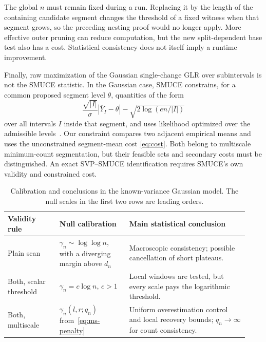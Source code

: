 \documentclass[pdflatex,sn-mathphys-num]{sn-jnl}
\theoremstyle{thmstyleone}
\theoremstyle{thmstyletwo}
\begin{document}
The global $n$ must remain fixed during a run. Replacing it by the length
of the containing candidate segment changes the threshold of a fixed
witness when that segment grows, so the preceding nesting proof would
no longer apply. More effective outer pruning can reduce computation, but
the new split-dependent base test also has a cost. Statistical consistency
does not itself imply a runtime improvement.

Finally, raw maximization of the Gaussian single-change GLR over
subintervals is not the SMUCE statistic. In the Gaussian case, SMUCE
constrains, for a common proposed segment level $\theta$, quantities of the
form
\begin{equation}\label{eq:smuce-distinction}
\frac{\sqrt{|I|}}{\sigma}|\overline Y_I-\theta|
-\sqrt{2\log(en/|I|)}
\end{equation}
over all intervals $I$ inside that segment, and uses likelihood optimized
over the admissible levels~\cite{frick2014}. Our constraint compares two
adjacent empirical means and uses the unconstrained segment-mean cost
\eqref{eq:cost}. Both belong to multiscale minimum-count segmentation, but
their feasible sets and secondary costs must be distinguished. An exact
SVP--SMUCE identification requires SMUCE's own validity and constrained cost.

\begin{table}[ht]
\caption{Calibration and conclusions in the known-variance Gaussian model.
The null scales in the first two rows are leading orders.}\label{tab:ms-comparison}
\centering\small
\begin{tabular}{@{}>{\raggedright\arraybackslash}p{0.20\linewidth}p{0.27\linewidth}p{0.46\linewidth}@{}}
\toprule
Validity rule & Null calibration & Main statistical conclusion\\
\midrule
Plain scan & $\gamma_n\sim\log\log n$, with a diverging margin above $d_n$
& Macroscopic consistency; possible cancellation of short plateaus.\\[0.5em]
Both, scalar threshold & $\gamma_n=c\log n$, $c>1$
& Local windows are tested, but every scale pays the logarithmic threshold.\\[0.5em]
Both, multiscale & $\gamma_n(l,r;q_n)$ from~\eqref{eq:ms-penalty}
& Uniform overestimation control and local recovery bounds; $q_n\to\infty$
for count consistency.\\
\bottomrule
\end{tabular}
\end{table}

\appendix
\end{document}

